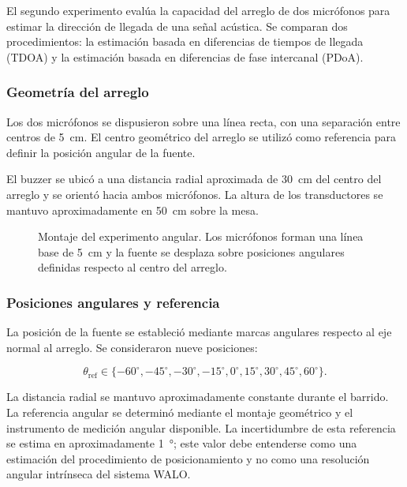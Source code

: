 El segundo experimento evalúa la capacidad del arreglo
de dos micrófonos para estimar la dirección de llegada
de una señal acústica. Se comparan dos procedimientos:
la estimación basada en diferencias de tiempos de
llegada (TDOA) y la estimación basada en diferencias
de fase intercanal (PDoA).

\subsubsection{Geometría del arreglo}

Los dos micrófonos se dispusieron sobre una línea
recta, con una separación entre centros de
\SI{5}{\centi\metre}. El centro geométrico del arreglo
se utilizó como referencia para definir la posición
angular de la fuente.

El buzzer se ubicó a una distancia radial aproximada
de \SI{30}{\centi\metre} del centro del arreglo y se
orientó hacia ambos micrófonos. La altura de los
transductores se mantuvo aproximadamente en
\SI{50}{\centi\metre} sobre la mesa.

\begin{figure}[!htbp]
    \centering
    
    \caption{Montaje del experimento angular. Los micrófonos
    forman una línea base de \SI{5}{\centi\metre} y la
    fuente se desplaza sobre posiciones angulares
    definidas respecto al centro del arreglo.}
    \label{fig:montaje_exp02}
\end{figure}

\subsubsection{Posiciones angulares y referencia}

La posición de la fuente se estableció mediante
marcas angulares respecto al eje normal al arreglo.
Se consideraron nueve posiciones:

\begin{equation}
    \theta_{\mathrm{ref}}\in
    \{-60^\circ,-45^\circ,-30^\circ,-15^\circ,
    0^\circ,15^\circ,30^\circ,45^\circ,60^\circ\}.
\end{equation}

La distancia radial se mantuvo aproximadamente
constante durante el barrido. La referencia angular
se determinó mediante el montaje geométrico y el
instrumento de medición angular disponible. La
incertidumbre de esta referencia se estima en
aproximadamente \SI{1}{\degree}; este valor debe
entenderse como una estimación del procedimiento
de posicionamiento y no como una resolución angular
intrínseca del sistema WALO.

